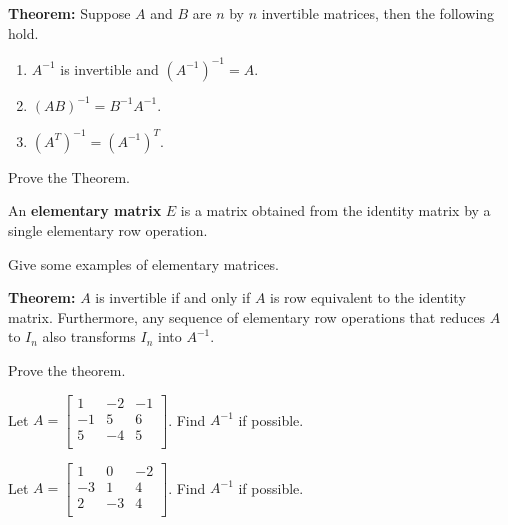 \begin{enumerate}
\newpage

{\bf Theorem:} Suppose $A$ and $B$ are $n$ by $n$ invertible matrices, then the following hold. 
\begin{enumerate}
\item $A^{-1}$ is invertible and $(A^{-1})^{-1}=A$.
\item $(AB)^{-1}=B^{-1} A^{-1}$.
\item $(A^{T})^{-1}=(A^{-1})^{T}$.
\end{enumerate}

\Problem Prove the Theorem.

\vfill

\newpage

\begin{defn}
An {\bf elementary matrix} $E$ is a matrix obtained from the identity matrix by a single elementary row operation.
\end{defn}

\Problem Give some examples of elementary matrices.

\vfill

{\bf Theorem:} $A$ is invertible if and only if $A$ is row equivalent to the identity matrix. Furthermore, any sequence of elementary row operations that reduces $A$ to $I_n$ also transforms $I_n$ into $A^{-1}$.

\Problem Prove the theorem.

\vfill
\vfill
\vfill

\newpage

\Problem 
\Part Let $A=\begin{bmatrix}
1 & -2 & -1\\
-1 &5 & 6\\
5 &-4 & 5\\
\end{bmatrix}$. Find $A^{-1}$ if possible.

\vfill

\Part Let $A=\begin{bmatrix}
1 & 0 & -2\\
-3 &1 & 4\\
2 &-3 & 4\\
\end{bmatrix}$. Find $A^{-1}$ if possible.

\vfill

\newpage


\end{enumerate}
